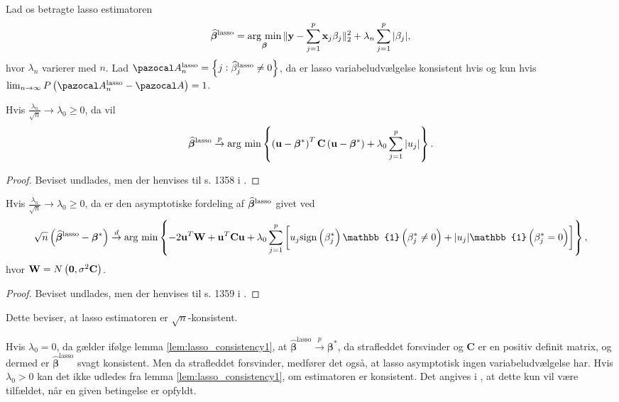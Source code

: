Lad os betragte lasso estimatoren
\begin{align*}
\widehat{\boldsymbol{\beta}}^\text{lasso} = \operatorname*{\arg\,\min}_{\boldsymbol{\beta}} \Vert \mathbf{y} - \sum_{j=1}^p \mathbf{x}_j \beta_j \Vert_2^2 + \lambda_n \sum_{j=1}^p \vert \beta_j \vert,
\end{align*}
hvor \(\lambda_n\) varierer med \(n\).
Lad \(\A_n^\text{lasso} = \cbr{j : \widehat{\beta}_j^\text{lasso} \neq 0}\), da er lasso variabeludvælgelse konsistent hvis og kun hvis \(\lim_{n \rightarrow \infty} P \del{\A_n^\text{lasso} - \A} = 1\).

\begin{lem}\label{lem:lasso_consistency1}
Hvis $\frac{\lambda_n}{\sqrt{n}} \rightarrow \lambda_0 \geq 0$, da vil
\begin{align*}
\widehat{\tbeta}^\text{lasso} \overset{p}{\rightarrow} \argmin \cbr{ \del{\mathbf{u} - \tbeta^*}^T \mathbf{C} \del{\mathbf{u} - \tbeta^*} + \lambda_0 \sum_{j=1}^p \vert u_j \vert}.
\end{align*}
\end{lem}
\begin{proof}
Beviset undlades, men der henvises til s. 1358 i \citep{adaptive_lasso_knight}.
\end{proof}
%
\begin{thm} \label{thm:asymp_lasso}
Hvis $\frac{\lambda_n}{\sqrt{n}} \rightarrow \lambda_0 \geq 0$, da er den asymptotiske fordeling af \(\widehat{\boldsymbol{\beta}}^\text{lasso}\) givet ved
\begin{align*}
\sqrt{n} \del{\widehat{\tbeta}^\text{lasso} - \tbeta^*} \overset{d}{\rightarrow} \argmin \cbr{ -2 \mathbf{u}^T \mathbf{W} + \mathbf{u}^T \mathbf{C} \mathbf{u} + \lambda_0 \sum_{j=1}^p \sbr{u_j \text{sign} \del{\beta^*_j} \mathbb{1} \del{\beta_j^* \neq 0} + \vert u_j \vert \mathbb{1} \del{\beta_j^* = 0}}},
\end{align*}
hvor \(\mathbf{W} = N\del{\mathbf{0}, \sigma^2 \mathbf{C}}\).
\end{thm}
\begin{proof}
Beviset undlades, men der henvises til s. 1359 i \citep{adaptive_lasso_knight}.
\end{proof}
Dette beviser, at lasso estimatoren er \(\sqrt{n}\)-konsistent.

Hvis $\lambda_0=0$, da gælder ifølge lemma \ref{lem:lasso_consistency1}, at $\widehat{\boldsymbol{\beta}}^\text{lasso} \overset{p}{\rightarrow} \boldsymbol{\beta}^{*}$, da strafleddet forsvinder og $\mathbf{C}$ er en positiv definit matrix, og dermed er $\widehat{\boldsymbol{\beta}}^\text{lasso}$ svagt konsistent. Men da strafleddet forsvinder, medfører det også, at lasso asymptotisk ingen variabeludvælgelse har. Hvis $\lambda_0>0$ kan det ikke udledes fra lemma \ref{lem:lasso_consistency1}, om estimatoren er konsistent. Det angives i \citep{adaptive_lasso}, at dette kun vil være tilfældet, når en given betingelse er opfyldt. 

